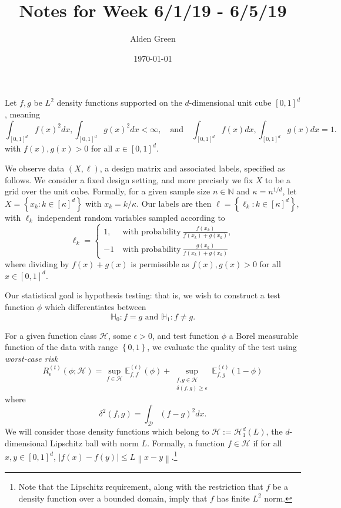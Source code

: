 \documentclass{article}
\newcommand{\norm}[1]{\left\lVert#1\right\rVert}
\newcommand{\abs}[1]{\left \lvert #1 \right \rvert}
\newcommand{\set}[1]{\left\{#1\right\}}
\newcommand{\1}{\mathbb{I}}
\newcommand{\D}{\mathcal{D}}
\newcommand{\Hclass}{\mathcal{H}}
\newcommand{\Ebb}{\mathbb{E}}
\theoremstyle{alden}
\theoremstyle{aldenthm}
\theoremstyle{definition}
\theoremstyle{remark}
\begin{document}
\title{Notes for Week 6/1/19 - 6/5/19}
\author{Alden Green}
\date{\today}
\maketitle

Let $f,g$ be $L^2$ density functions supported on the $d$-dimensional unit cube $[0,1]^d$, meaning
\begin{equation*}
\int_{[0,1]^d} f(x)^2 dx, \int_{[0,1]^d} g(x)^2 dx < \infty, \quad \text{and} \quad \int_{[0,1]^d} f(x) dx, \int_{[0,1]^d} g(x) dx = 1.
\end{equation*}
with $f(x), g(x) > 0$ for all $x \in [0,1]^d$.

We observe data $(X,\ell)$, a design matrix and associated labels, specified as follows. We consider a fixed design setting, and more precisely we fix $X$ to be a grid over the unit cube. Formally, for a given sample size $n \in \mathbb{N}$ and $\kappa = n^{1/d}$, let $X = \set{x_k: k \in [\kappa]^d}$ with $x_k = k/\kappa$. Our labels are then $\ell = \set{\ell_k: k \in [\kappa]^d}$, with $\ell_k$ independent random variables sampled according to
\begin{equation*}
\ell_k = 
\begin{cases}
1, ~ & \textrm{with probability}~ \frac{f(x_k)}{f(x_k) + g(x_k)}, \\
-1 ~ & \textrm{with probability}~ \frac{g(x_k)}{f(x_k) + g(x_k)}
\end{cases}
\end{equation*}
where dividing by $f(x) + g(x)$ is permissible as $f(x), g(x) > 0$ for all $x \in [0,1]^d$.

Our statistical goal is hypothesis testing: that is, we wish to construct a test function $\phi$ which differentiates between
\begin{equation*}
\mathbb{H}_0: f = g \text{ and } \mathbb{H}_1: f \neq g.
\end{equation*}

For a given function class $\Hclass$, some $\epsilon > 0$, and test function $\phi$ a Borel measurable function of the data with range $\set{0,1}$, we evaluate the quality of the test using \emph{worst-case risk}
\begin{equation*}
R_{\epsilon}^{(t)}(\phi; \Hclass) = \sup_{f \in \Hclass} \Ebb_{f,f}^{(t)}(\phi) + \sup_{ \substack{f,g \in \Hclass \\ \delta(f,g) \geq \epsilon } } \Ebb_{f,g}^{(t)}(1 - \phi)
\end{equation*} 
where 
\begin{equation*}
\delta^2(f,g) = \int_{\D} (f - g)^2 dx.
\end{equation*}
We will consider those density functions which belong to $\mathcal{H} := \mathcal{H}_{1}^d(L)$, the $d$-dimensional Lipschitz ball with norm $L$. Formally, a function $f \in \mathcal{H}$ if for all $x,y \in [0,1]^d$, $\abs{f(x) - f(y)} \leq L \norm{x - y}$.\footnote{Note that the Lipschitz requirement, along with the restriction that $f$ be a density function over a bounded domain, imply that $f$ has finite $L^2$ norm.}
\end{document}
